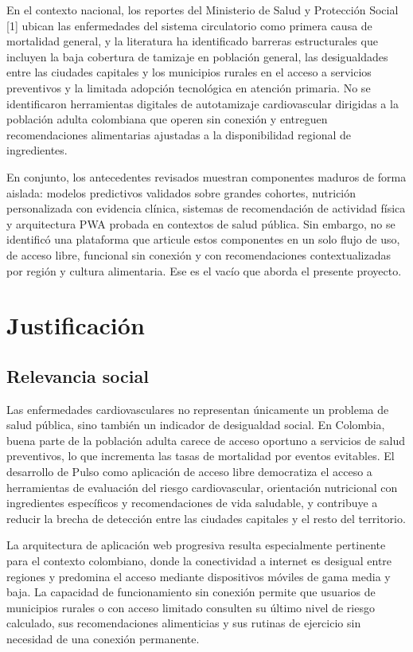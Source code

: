 \documentclass[conference]{IEEEtran}
\begin{document}
En el contexto nacional, los reportes del Ministerio de Salud y Protección Social [1] ubican las enfermedades del sistema circulatorio como primera causa de mortalidad general, y la literatura ha identificado barreras estructurales que incluyen la baja cobertura de tamizaje en población general, las desigualdades entre las ciudades capitales y los municipios rurales en el acceso a servicios preventivos y la limitada adopción tecnológica en atención primaria. No se identificaron herramientas digitales de autotamizaje cardiovascular dirigidas a la población adulta colombiana que operen sin conexión y entreguen recomendaciones alimentarias ajustadas a la disponibilidad regional de ingredientes.

En conjunto, los antecedentes revisados muestran componentes maduros de forma aislada: modelos predictivos validados sobre grandes cohortes, nutrición personalizada con evidencia clínica, sistemas de recomendación de actividad física y arquitectura PWA probada en contextos de salud pública. Sin embargo, no se identificó una plataforma que articule estos componentes en un solo flujo de uso, de acceso libre, funcional sin conexión y con recomendaciones contextualizadas por región y cultura alimentaria. Ese es el vacío que aborda el presente proyecto.

\section{Justificación}
\subsection{Relevancia social}
Las enfermedades cardiovasculares no representan únicamente un problema de salud pública, sino también un indicador de desigualdad social. En Colombia, buena parte de la población adulta carece de acceso oportuno a servicios de salud preventivos, lo que incrementa las tasas de mortalidad por eventos evitables. El desarrollo de Pulso como aplicación de acceso libre democratiza el acceso a herramientas de evaluación del riesgo cardiovascular, orientación nutricional con ingredientes específicos y recomendaciones de vida saludable, y contribuye a reducir la brecha de detección entre las ciudades capitales y el resto del territorio.

La arquitectura de aplicación web progresiva resulta especialmente pertinente para el contexto colombiano, donde la conectividad a internet es desigual entre regiones y predomina el acceso mediante dispositivos móviles de gama media y baja. La capacidad de funcionamiento sin conexión permite que usuarios de municipios rurales o con acceso limitado consulten su último nivel de riesgo calculado, sus recomendaciones alimenticias y sus rutinas de ejercicio sin necesidad de una conexión permanente.
\end{document}
